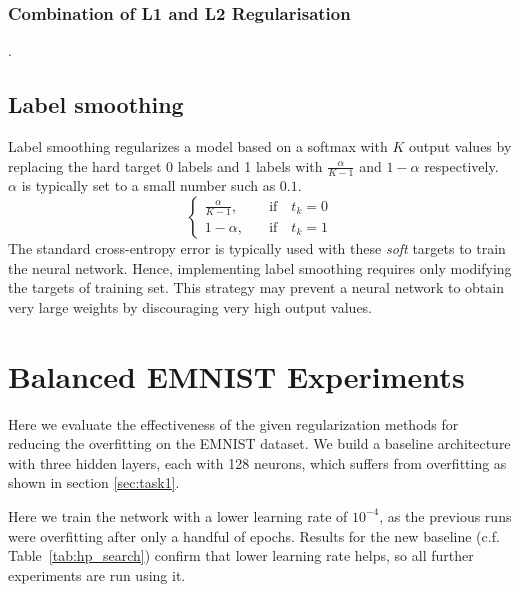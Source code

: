\documentclass{article}
\begin{document}
\subsubsection{Combination of L1 and L2 Regularisation}
\label{sec:L1L2combo} 

\questionSix.

\subsection{Label smoothing}
Label smoothing regularizes a model based on a softmax with $K$ output values by replacing the hard target 0 labels and 1 labels with $\frac{\alpha}{K-1}$ and $1-\alpha$ respectively. 
$\alpha$ is typically set to a small number such as $0.1$.
\begin{equation}
    \begin{cases}
        \frac{\alpha}{K-1}, & \quad \text{if} \quad t_k=0\\
        1 - \alpha, & \quad \text{if} \quad t_k=1
    \end{cases}    
\end{equation}
The standard cross-entropy error is typically used with these \emph{soft} targets to train the neural network. 
Hence, implementing label smoothing requires only modifying the targets of training set.
This strategy may prevent a neural network to obtain very large weights by discouraging very high output values.

\section{Balanced EMNIST Experiments}

\questionTableThree

\questionFigureFour

\questionTableFour

\questionFigureFive

\questionFigureSix

\label{sec:task2.2}

Here we evaluate the effectiveness of the given regularization methods for reducing the overfitting on the EMNIST dataset.
We build a baseline architecture with three hidden layers, each with 128 neurons, which suffers from overfitting as shown in section \ref{sec:task1}.

Here we train the network with a lower learning rate of $10^{-4}$, as the previous runs were overfitting after only a handful of epochs. 
Results for the new baseline (c.f. Table~\ref{tab:hp_search}) confirm that lower learning rate helps, so all further experiments are run using it.
\end{document}

